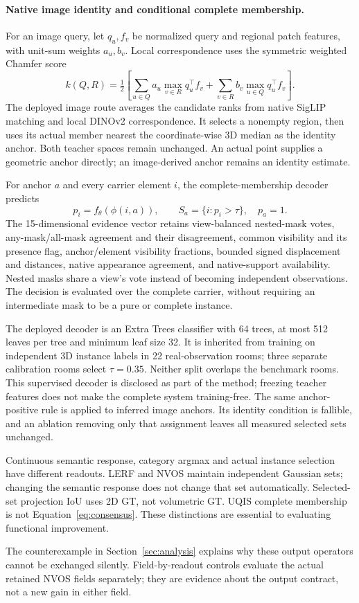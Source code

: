 \paragraph{Native image identity and conditional complete membership.}
For an image query, let $q_u,f_v$ be normalized query and regional patch
features, with unit-sum weights $a_u,b_v$. Local correspondence uses the
symmetric weighted Chamfer score
\begin{equation}
 k(Q,R)=\tfrac12\left[\sum_{u\in Q}a_u\max_{v\in R}q_u^\top f_v+
                         \sum_{v\in R}b_v\max_{u\in Q}q_u^\top f_v\right].
\end{equation}
The deployed image route averages the candidate ranks from native SigLIP
matching and local DINOv2 correspondence. It selects a nonempty region, then
uses its actual member nearest the coordinate-wise 3D median as the identity
anchor. Both teacher spaces remain unchanged. An actual point supplies a
geometric anchor directly; an image-derived anchor remains an identity estimate.

For anchor $a$ and every carrier element $i$, the complete-membership decoder
predicts
\begin{equation}
 p_i=f_\theta(\phi(i,a)),\qquad S_a=\{i:p_i>\tau\},\quad p_a=1.
\end{equation}
The 15-dimensional evidence vector retains view-balanced nested-mask votes,
any-mask/all-mask agreement and their disagreement, common visibility and its
presence flag, anchor/element visibility fractions, bounded signed displacement
and distances, native appearance agreement, and native-support availability.
Nested masks share a view's vote instead of becoming independent observations.
The decision is evaluated over the complete carrier, without requiring an
intermediate mask to be a pure or complete instance.

The deployed decoder is an Extra Trees classifier with 64 trees, at most 512
leaves per tree and minimum leaf size 32. It is inherited from training on
independent 3D instance labels in 22 real-observation rooms; three separate
calibration rooms select $\tau=0.35$. Neither split overlaps the benchmark
rooms. This supervised decoder is disclosed as part of the method; freezing
teacher features does not make the complete system training-free. The same
anchor-positive rule is applied to inferred image anchors. Its identity
condition is fallible, and an ablation removing only that assignment leaves
all measured selected sets unchanged.

Continuous semantic response, category argmax and actual instance selection
have different readouts. LERF and NVOS maintain independent Gaussian sets;
changing the semantic response does not change that set automatically.
Selected-set projection IoU uses 2D GT, not volumetric GT. UQIS complete
membership is not Equation~\ref{eq:consensus}. These distinctions are essential
to evaluating functional improvement.

The counterexample in Section~\ref{sec:analysis} explains why these output
operators cannot be exchanged silently. Field-by-readout controls evaluate the
actual retained NVOS fields separately; they are evidence about the output
contract, not a new gain in either field.
